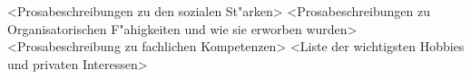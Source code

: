\documentclass[german]{ecv}
\begin{document}
\begin{ecv}
\ecvPageBreak
{}
                {<Prosabeschreibungen zu den sozialen St"arken>
                }
                {<Prosabeschreibungen zu Organisatorischen F"ahigkeiten
                 und wie sie erworben wurden>
                }
                {<Prosabeschreibung zu fachlichen Kompetenzen>}
                {<Liste der wichtigsten Hobbies und privaten Interessen>
                }



\end{ecv}

\end{document}
